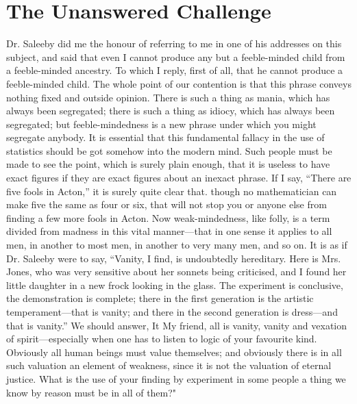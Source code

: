 \documentclass{book}
\begin{document}
\chapter{The Unanswered Challenge}
\label{chapter-7}
Dr. Saleeby did me the honour of referring to me in one of his addresses on this subject, and said that even I cannot produce any but a feeble-minded child from a feeble-minded ancestry. To which I reply, first of all, that he cannot produce a feeble-minded child. The whole point of our contention is that this phrase conveys nothing fixed and outside opinion. There is such a thing as mania, which has always been segregated; there is such a thing as idiocy, which has always been segregated; but feeble-mindedness is a new phrase under which you might segregate anybody. It is essential that this fundamental fallacy in the use of statistics should be got somehow into the modern mind. Such people must be made to see the point, which is surely plain enough, that it is useless to have exact figures if they are exact figures about an inexact phrase. If I say, “There are five fools in Acton,” it is surely quite clear that. though no mathematician can make five the same as four or six, that will not stop you or anyone else from finding a few more fools in Acton. Now weak-mindedness, like folly, is a term divided from madness in this vital manner—that in one sense it applies to all men, in another to most men, in another to very many men, and so on. It is as if Dr. Saleeby were to say, “Vanity, I find, is undoubtedly hereditary. Here is Mrs. Jones, who was very sensitive about her sonnets being criticised, and I found her little daughter in a new frock looking in the glass. The experiment is conclusive, the demonstration is complete; there in the first generation is the artistic temperament—that is vanity; and there in the second generation is dress—and that is vanity.” We should answer, It My friend, all is vanity, vanity and vexation of spirit—especially when one has to listen to logic of your favourite kind. Obviously all human beings must value themselves; and obviously there is in all such valuation an element of weakness, since it is not the valuation of eternal justice. What is the use of your finding by experiment in some people a thing we know by reason must be in all of them?"
\end{document}

